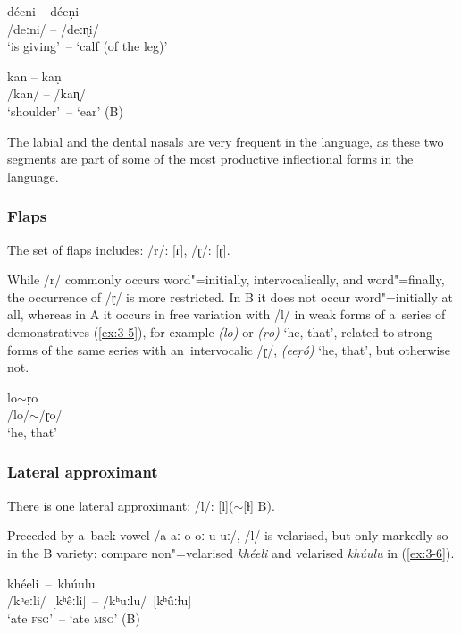 \begin{exe}
\ex
\label{ex:3-3}
\gll déeni -- déeṇi \\
/deːni/ -- /deːɳi/ \\
\glt `is giving'~-- `calf (of the leg)' 

\ex
\label{ex:3-4}
\gll kan -- kaṇ \\
/kan/ -- /kaɳ/ \\
\glt `shoulder'~-- `ear' (B)
\end{exe}

The labial and the dental nasals are very frequent in the language, as these two segments are part of some of the most productive inflectional forms in the language.

\subsubsection*{Flaps}

The set of flaps includes: /r/: [ɾ], /ɽ/: [ɽ].


While /r/ commonly occurs word"=initially, intervocalically, and word"=finally, the occurrence of /ɽ/
is more restricted. In B it does not occur word"=initially at all, whereas in A it occurs in free
variation with /l/ in weak forms of a~series of demonstratives (\ref{ex:3-5}), for example \textit{(lo)} or
\textit{(ṛo)} `he, that', related to strong forms of the same series with an~intervocalic
/ɽ/, \textit{(eeṛó)} `he, that', but otherwise not.

\begin{exe}
\ex
\label{ex:3-5}
\gll lo$\sim${}ṛo \\
/lo/$\sim${}/ɽo/ \\
\glt `he, that' 
\end{exe}

\subsubsection*{Lateral approximant}

There is one lateral approximant: /l/: [l]($\sim$[ɫ] B).


Preceded by a~back vowel /a aː o oː u uː/, /l/ is velarised, but only markedly so in the B variety: compare non"=velarised \textit{khéeli} and velarised \textit{khúulu} in (\ref{ex:3-6}).

\begin{exe}
\ex
\label{ex:3-6}
\gll khéeli~--~khúulu \\
/kʰeːli/~[kʰêːli]~-- /kʰuːlu/~[kʰûːɫu] \\ 
\glt `ate \textsc{fsg}'~-- `ate \textsc{msg}' (B)
\end{exe}

